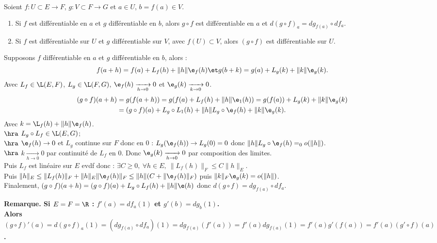 \documentclass[11pt]{article}
\begin{document}
\begin{prop}{}{}
    Soient $f:U\subset E \to F$, $g:V\subset F \to G$ et $a\in U$, $b=f(a)\in V$.
    \begin{enumerate}
        \item Si $f$ est différentiable en $a$ et $g$ différentiable en $b$, alors $g\circ f$ est différentiable en $a$ et $d(g\circ f)_a = dg_{f(a)}\circ df_a$.
        \item Si $f$ est différentiable sur $U$ et $g$ différentiable sur $V$, avec $f(U)\subset V$, alors $(g\circ f)$ est différentiable sur $U$.
    \end{enumerate}
    \tcblower
     Supposons $f$ différentiable en $a$ et $g$ différentiable en $b$, alors :
    \begin{equation*}
        f(a+h) = f(a) + L_f(h) + \|h\|\e_f(h) \et g(b+k) = g(a) + L_g(k) + \|k\|\e_g(k).
    \end{equation*}
    Avec $L_f\in\L(E,F)$, $L_g\in\L(F,G)$, $\e_f(h)\xrightarrow[h\to 0]{}0$ et $\e_g(k)\xrightarrow[k\to0]{}0$.
    \begin{align*}
        (g\circ f)(a+h) &= g(f(a+h)) = g(f(a) + L_f(h) + \|h\|\e_1(h)) = g(f(a)) + L_g(k) + \|k\|\e_g(k)\\
        &=(g\circ f)(a) + L_g\circ L_1(h) + \|h\|L_g\circ \e_f(h) + \|k\|\e_g(k).
    \end{align*}
    Avec $k=\L_f(h) + \|h\|\e_f(h)$.\\
    $\hra$ $L_g\circ L_f \in \L(E,G)$;\\
    $\hra$ $\e_f(h)\to0$ et $L_g$ continue sur $F$ donc en 0 : $L_g(\e_f(h))\to L_g(0)=0$ donc $\|h\|L_g\circ \e_f(h)=_0o(\|h\|)$.\\
    $\hra$ $k\xrightarrow[h\to 0]{}0$ par continuité de $L_f$ en 0. Donc $\e_g(k)\xrightarrow[h\to0]{}0$ par composition des limites.\\
    Puis $L_f$ est linéaire sur $E$ evdf donc : $\exists C\geq0, ~ \forall h \in E, ~ \|L_f(h)\|_F\leq C\|h\|_E$.\\
    Puis $\|h\|_E\leq \|L_f(h)\|_F + \|h\|_E\|\e_f(h)\|_F \leq \|h\|(C+\|\e_f(h)\|_F)$ puis $\|k\|_F\e_g(k)=o(\|h\|)$.\\
    Finalement, $(g\circ f)(a+h)=(g\circ f)(a) + L_g\circ L_f(h) + \|h\|\e(h)$ donc $d(g\circ f) = dg_{f(a)}\circ df_a$.
\end{prop}

\bf{Remarque.} Si $E=F=\R$ : $f'(a)=df_a(1)$ et $g'(b)=dg_b(1)$.\\
Alors $(g\circ f)'(a)=d(g\circ f)_a(1)=(dg_{f(a)}\circ df_a)(1)=dg_{f(a)}(f'(a))=f'(a)dg_{f(a)}(1)=f'(a)g'(f(a))=f'(a)(g'\circ f)(a)$.
\end{document}
